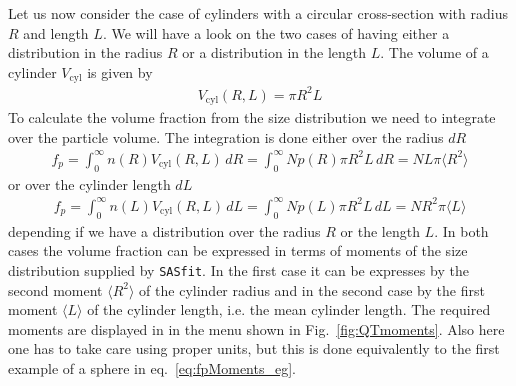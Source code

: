 Let us now consider the case of cylinders with a circular
cross-section with radius $R$ and length $L$. We will have a look on
the two cases of having either a distribution in the radius $R$ or a
distribution in the length $L$. The volume of a cylinder
$V_\textrm{cyl}$ is given by
\begin{align}
V_\textrm{cyl}(R,L) = \pi R^2 L
\end{align}
To calculate the volume fraction from the size distribution we need
to integrate over the particle volume. The integration is done
either over the radius $dR$
\begin{align}
f_p = \int_0^\infty n(R) V_\textrm{cyl}(R,L) \, dR
    = \int_0^\infty N p(R) \pi R^2 L \, dR
    = N L \pi \langle R^2 \rangle
\label{eq:fpMomentsCylR}
\end{align}
or over the cylinder length $dL$
\begin{align}
f_p = \int_0^\infty n(L) V_\textrm{cyl}(R,L) \, dL
    = \int_0^\infty N p(L) \pi R^2 L \, dL
    = N R^2 \pi \langle L \rangle
\label{eq:fpMomentsCylL}
\end{align}
depending if we have a distribution over the radius $R$ or the
length $L$. In both cases the volume fraction can be expressed in
terms of moments of the size distribution supplied by {\tt SASfit}.
In the first case it can be expresses by the second moment $\langle
R^2 \rangle$ of the cylinder radius and in the second case by the
first moment $\langle L \rangle$ of the cylinder length, i.e. the
mean cylinder length. The required moments are displayed in \SASfit
in the menu shown in Fig.\ \ref{fig:QTmoments}. Also here one has to
take care using proper units, but this is done equivalently to the
first example of a sphere in eq.\ \ref{eq:fpMoments_eg}.

